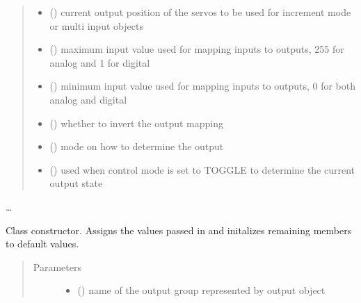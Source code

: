 \documentclass[letterpaper,10pt,english]{sphinxmanual}
\begin{document}
\begin{fulllineitems}
\begin{quote}
\begin{description}
\begin{itemize}
\item {} 
\sphinxAtStartPar
{}(\sphinxstyleemphasis{{[}int{]}}) \textendash{} current output position of the 
servos to be used for increment mode or multi input objects

\item {} 
\sphinxAtStartPar
{}() \textendash{} maximum input value used for mapping 
inputs to outputs, 255 for analog and 1 for digital

\item {} 
\sphinxAtStartPar
{}() \textendash{} minimum input value used for mapping 
inputs to outputs, 0 for both analog and digital

\item {} 
\sphinxAtStartPar
{}(\sphinxstyleemphasis{{[}Boolean{]}}) \textendash{} whether to invert the output 
mapping

\item {} 
\sphinxAtStartPar
{}() \textendash{} mode on how to determine 
the output

\item {} 
\sphinxAtStartPar
{}() \textendash{} used when control mode 
is set to TOGGLE to determine the current output state

\end{itemize}

\end{description}\end{quote}

\sphinxAtStartPar
…

\sphinxAtStartPar
{}

\begin{fulllineitems}
\label{\detokenize{base:OutputObject.OutputObject.__init__}}
\sphinxAtStartPar
Class constructor. Assigns the values passed in and initalizes remaining 
members to default values.
\begin{quote}\begin{description}
\item[{Parameters}] \leavevmode\begin{itemize}
\item {} 
\sphinxAtStartPar
{} () \textendash{} name of the output group represented by output object


\end{itemize}
\end{description}
\end{quote}
\end{fulllineitems}
\end{fulllineitems}
\end{document}
